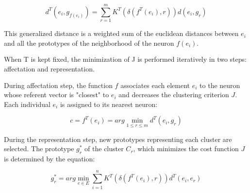 \documentclass[10pt, conference, compsocconf]{IEEEtran}
\begin{document}
\begin{equation}
d^T(e_i, g_{f(e_i)}) = \sum_{r=1}^m K^T(\delta(f^T(e_i), r))d(e_i, g_r)
\label{distance}
\end{equation}

%

\noindent This generalized distance is a weighted sum of the euclidean distances between $e_i$ and all the prototypes of the neighborhood of the neuron $f(e_i)$.




When T is kept fixed, the minimization of J is performed iteratively in two steps: affectation and representation.

During affectation step, the function $f$ associates each element $e_i$ to the neuron whose referent vector is "closest" to $e_i$ and decreases the clustering criterion $J$. Each individual $e_i$ is assigned to its nearest neuron:

\begin{equation}
c = f^T(e_i) = arg \min_{1 \leq r \leq m} d^T(e_i, g_r)
\label{f_function_batch} 
\end{equation}


During the representation step, new prototypes representing each cluster are selected. The prototype $g^*_r$ of the cluster $C_r$, which minimizes the cost function $J$ is determined by the equation:

\begin{equation}
g^*_r = arg \min_{e \in E} \sum_{i=1}^n K^T (\delta(f^T(e_i),r)) d^T(e_i, e_r)
\label{G_batch_rossi}
\end{equation}
\end{document}
